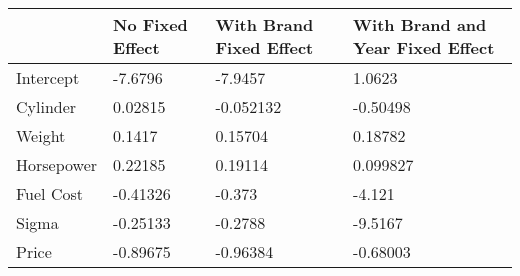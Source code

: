 \begin{tabular}{llll}
& No Fixed Effect & With Brand Fixed Effect & With Brand and Year Fixed Effect \\ 
\hline 
Intercept & -7.6796 & -7.9457 & 1.0623 \\ 
Cylinder & 0.02815 & -0.052132 & -0.50498 \\ 
Weight & 0.1417 & 0.15704 & 0.18782 \\ 
Horsepower & 0.22185 & 0.19114 & 0.099827 \\ 
Fuel Cost & -0.41326 & -0.373 & -4.121 \\ 
Sigma & -0.25133 & -0.2788 & -9.5167 \\ 
Price & -0.89675 & -0.96384 & -0.68003 \\ 
\hline 
\end{tabular}